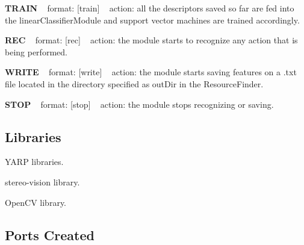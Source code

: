 {\bfseries T\+R\+A\+IN} ~\newline
format\+: \mbox{[}train\mbox{]} ~\newline
action\+: all the descriptors saved so far are fed into the linear\+Classifier\+Module and support vector machines are trained accordingly.

{\bfseries R\+EC} ~\newline
format\+: \mbox{[}rec\mbox{]} ~\newline
action\+: the module starts to recognize any action that is being performed.

{\bfseries W\+R\+I\+TE} ~\newline
format\+: \mbox{[}write\mbox{]} ~\newline
action\+: the module starts saving features on a .txt file located in the directory specified as out\+Dir in the Resource\+Finder.

{\bfseries S\+T\+OP} ~\newline
format\+: \mbox{[}stop\mbox{]} ~\newline
action\+: the module stops recognizing or saving.\hypertarget{group__gestureRecognitionStereo_lib_sec}{}\subsection{Libraries}\label{group__gestureRecognitionStereo_lib_sec}

\begin{DoxyItemize}
\item Y\+A\+RP libraries.
\item stereo-\/vision library.
\item Open\+CV library.
\end{DoxyItemize}\hypertarget{group__gestureRecognitionStereo_portsc_sec}{}\subsection{Ports Created}\label{group__gestureRecognitionStereo_portsc_sec}

